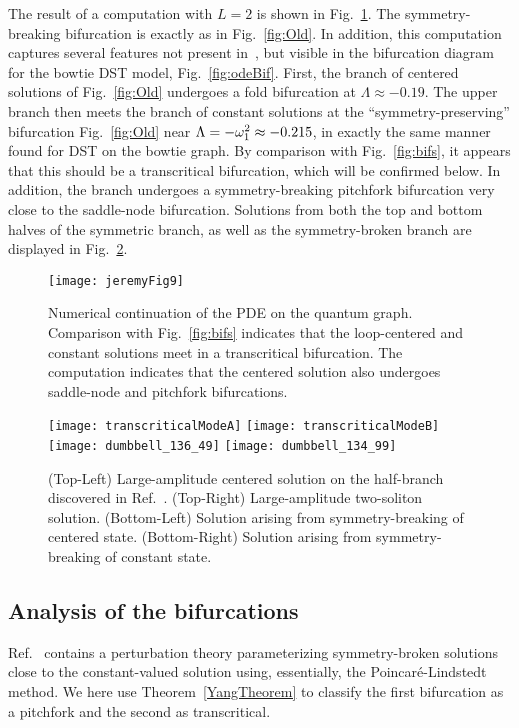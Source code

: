 \documentclass{article}
\numberwithin{equation}{section}
\numberwithin{figure}{section}
\begin{document}
The result of a computation with $L=2$ is shown in Fig.~\ref{fig:pdeBif}. The symmetry-breaking bifurcation is exactly as in Fig.~\ref{fig:Old}. In addition, this computation captures several features not present in~\cite{Marzuola:2016bl}, but visible in the bifurcation diagram for the bowtie DST model, Fig.~\ref{fig:odeBif}. First, the branch of centered solutions of Fig.~\ref{fig:Old} undergoes a fold bifurcation at $\Lambda \approx -0.19$. The upper branch then meets the branch of constant solutions at the ``symmetry-preserving'' bifurcation Fig.~\ref{fig:Old} near $\Lambda = -\omega_1^2 \approx-0.215$, in exactly the same manner found for DST on the bowtie graph. By comparison with Fig.~\ref{fig:bifs}, it appears that this should be a transcritical bifurcation, which will be confirmed below. In addition, the branch undergoes a symmetry-breaking pitchfork bifurcation very close to the saddle-node bifurcation. Solutions from both the top and bottom halves of the symmetric branch, as well as the symmetry-broken branch are displayed in Fig.~\ref{fig:evenSolutions}.

\begin{figure}[htbp] %
   \centering
   \texttt{[image: jeremyFig9]} 
   \caption{Numerical continuation of the PDE on the quantum graph. Comparison with Fig.~\ref{fig:bifs} indicates that the loop-centered and constant solutions meet in a transcritical bifurcation. The computation indicates that the centered solution also undergoes saddle-node and pitchfork bifurcations.}
\label{fig:pdeBif}
\end{figure}

\begin{figure}[htbp] %
   \centering
   \texttt{[image: transcriticalModeA]}
   \texttt{[image: transcriticalModeB]}
      \texttt{[image: dumbbell\_136\_49]}
      \texttt{[image: dumbbell\_134\_99]}
   \caption{(Top-Left) Large-amplitude centered solution on the half-branch discovered in Ref.~\cite{Marzuola:2016bl}. (Top-Right) Large-amplitude two-soliton solution. (Bottom-Left) Solution arising from symmetry-breaking of centered state. (Bottom-Right) Solution arising from symmetry-breaking of constant state.}
\label{fig:evenSolutions}
\end{figure}

\subsection{Analysis of the bifurcations}
Ref.~\cite{Marzuola:2016bl} contains a perturbation theory parameterizing symmetry-broken solutions close to the constant-valued solution using, essentially, the Poincar\'e-Lindstedt method. We here use Theorem~\ref{YangTheorem} to classify the first bifurcation as a pitchfork and the second as transcritical.
\end{document}
